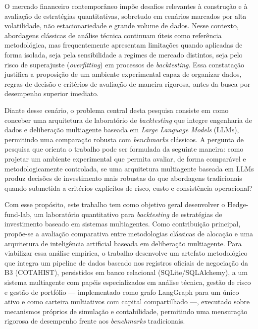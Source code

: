 \documentclass{eic-bcc-tcc}
\begin{document}
O mercado financeiro contemporâneo impõe desafios relevantes à construção e à avaliação de estratégias quantitativas, sobretudo em cenários marcados por alta volatilidade, não estacionariedade e grande volume de dados. Nesse contexto, abordagens clássicas de análise técnica continuam úteis como referência metodológica, mas frequentemente apresentam limitações quando aplicadas de forma isolada, seja pela sensibilidade a regimes de mercado distintos, seja pelo risco de superajuste (\textit{overfitting}) em processos de \textit{backtesting}. Essa constatação justifica a proposição de um ambiente experimental capaz de organizar dados, regras de decisão e critérios de avaliação de maneira rigorosa, antes da busca por desempenho superior imediato.

Diante desse cenário, o problema central desta pesquisa consiste em como conceber uma arquitetura de laboratório de \textit{backtesting} que integre engenharia de dados e deliberação multiagente baseada em \textit{Large Language Models} (LLMs), permitindo uma comparação robusta com \textit{benchmarks} clássicos. A pergunta de pesquisa que orienta o trabalho pode ser formulada da seguinte maneira: como projetar um ambiente experimental que permita avaliar, de forma comparável e metodologicamente controlada, se uma arquitetura multiagente baseada em LLMs produz decisões de investimento mais robustas do que abordagens tradicionais quando submetida a critérios explícitos de risco, custo e consistência operacional?

Com esse propósito, este trabalho tem como objetivo geral desenvolver o Hedge-fund-lab, um laboratório quantitativo para \textit{backtesting} de estratégias de investimento baseado em sistemas multiagentes. Como contribuição principal, propõe-se a avaliação comparativa entre metodologias clássicas de alocação e uma arquitetura de inteligência artificial baseada em deliberação multiagente. Para viabilizar essa análise empírica, o trabalho desenvolve um artefato metodológico que integra um pipeline de dados baseado nos registros oficiais de negociação da B3 (COTAHIST), persistidos em banco relacional (SQLite/SQLAlchemy), a um sistema multiagente com papéis especializados em análise técnica, gestão de risco e gestão de portfólio --- implementado como grafo LangGraph para um único ativo e como carteira multiativos com capital compartilhado ---, executado sobre mecanismos próprios de simulação e contabilidade, permitindo uma mensuração rigorosa de desempenho frente aos \textit{benchmarks} tradicionais.
\end{document}
